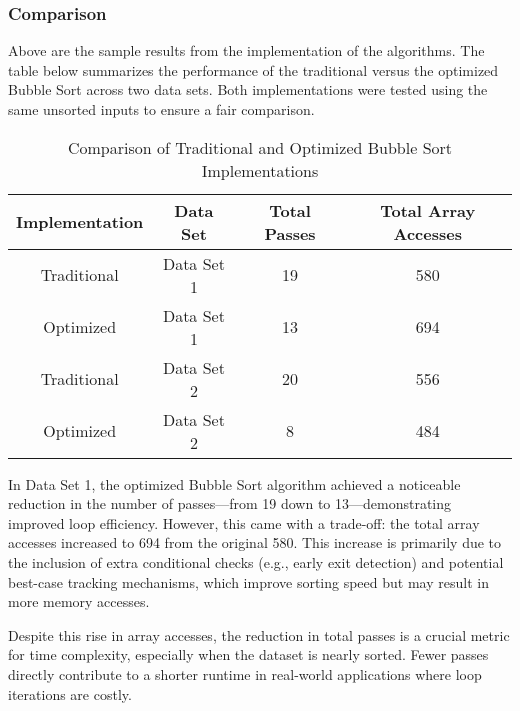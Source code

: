 \subsubsection{Comparison}


Above are the sample results from the implementation of the algorithms. The table below summarizes the performance of the traditional versus the optimized Bubble Sort across two data sets. Both implementations were tested using the same unsorted inputs to ensure a fair comparison.

\begin{table}[h]
    \centering
    \caption{Comparison of Traditional and Optimized Bubble Sort Implementations}
    \begin{tabular}{|c|c|c|c|}
        \hline
        \textbf{Implementation} & \textbf{Data Set} & \textbf{Total Passes} & \textbf{Total Array Accesses} \\
        \hline
        Traditional & Data Set 1 & 19 & 580 \\
        Optimized   & Data Set 1 & 13 & 694 \\
        \hline
        Traditional & Data Set 2 & 20 & 556 \\
        Optimized   & Data Set 2 & 8  & 484 \\
        \hline
    \end{tabular}
    \label{tab:sort_comparison}
\end{table}

In Data Set 1, the optimized Bubble Sort algorithm achieved a noticeable reduction in the number of passes—from 19 down to 13—demonstrating improved loop efficiency. However, this came with a trade-off: the total array accesses increased to 694 from the original 580. This increase is primarily due to the inclusion of extra conditional checks (e.g., early exit detection) and potential best-case tracking mechanisms, which improve sorting speed but may result in more memory accesses.

Despite this rise in array accesses, the reduction in total passes is a crucial metric for time complexity, especially when the dataset is nearly sorted. Fewer passes directly contribute to a shorter runtime in real-world applications where loop iterations are costly.

